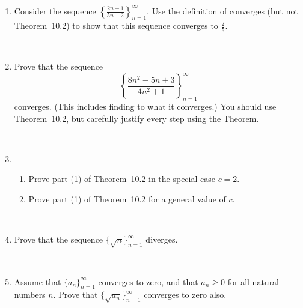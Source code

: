 \documentclass{amsart}
\def\R{\mathbb R}
\def\ds{\displaystyle}
\begin{document}
\begin{enumerate}

\item Consider the sequence $\ds \left\{ \frac{2n+1}{5n-2} \right\}_{n=1}^\infty$.
Use the definition of converges (but not Theorem~10.2) to show that this sequence converges to $\ds \frac{2}{5}$.

\

\item Prove that the sequence \[ \left\{ \frac{ 8 n^2 - 5n +3} {4 n^2 + 1} \right\}_{n=1}^\infty\]
converges. (This includes finding to what it converges.) You should use Theorem~10.2, but carefully justify every step using the Theorem.

\


\item \begin{enumerate}
\item Prove part (1) of Theorem~10.2 in the special case $c=2$.
\item Prove part (1) of Theorem~10.2 for a general value of $c$.
\end{enumerate}
 
 \

\item Prove that the sequence $\{\sqrt{n}\}_{n=1}^\infty$ diverges.

\

\item Assume that $\{a_n\}_{n=1}^\infty$ converges to zero, and that $a_n\geq 0$ for all natural numbers $n$. Prove that $\{ \sqrt{a_n}\}_{n=1}^\infty$ converges to zero also.






\end{enumerate}
\end{document}
